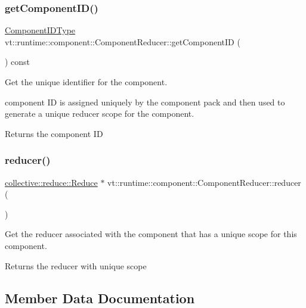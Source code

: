 \subsubsection{\texorpdfstring{get\+Component\+I\+D()}{getComponentID()}}
{\footnotesize\ttfamily \hyperlink{namespacevt_ab6ac935c168b809c422d5121da4f2700}{Component\+I\+D\+Type} vt\+::runtime\+::component\+::\+Component\+Reducer\+::get\+Component\+ID (\begin{DoxyParamCaption}{ }\end{DoxyParamCaption}) const\hspace{0.3cm}{\ttfamily [inline]}}



Get the unique identifier for the component. 

component ID is assigned uniquely by the component pack and then used to generate a unique reducer scope for the component.

\begin{DoxyReturn}{Returns}
the component ID 
\end{DoxyReturn}
\mbox{\label{structvt_1_1runtime_1_1component_1_1_component_reducer_af9d694f9d62d973a2cde6e52c55bef14}} 
\subsubsection{\texorpdfstring{reducer()}{reducer()}}
{\footnotesize\ttfamily \hyperlink{structvt_1_1collective_1_1reduce_1_1_reduce}{collective\+::reduce\+::\+Reduce} $\ast$ vt\+::runtime\+::component\+::\+Component\+Reducer\+::reducer (\begin{DoxyParamCaption}{ }\end{DoxyParamCaption})}



Get the reducer associated with the component that has a unique scope for this component. 

\begin{DoxyReturn}{Returns}
the reducer with unique scope 
\end{DoxyReturn}


\subsection{Member Data Documentation}
\mbox{\label{structvt_1_1runtime_1_1component_1_1_component_reducer_ac9c39c6eafc72a1a240ed67ea12b3e66}} 
